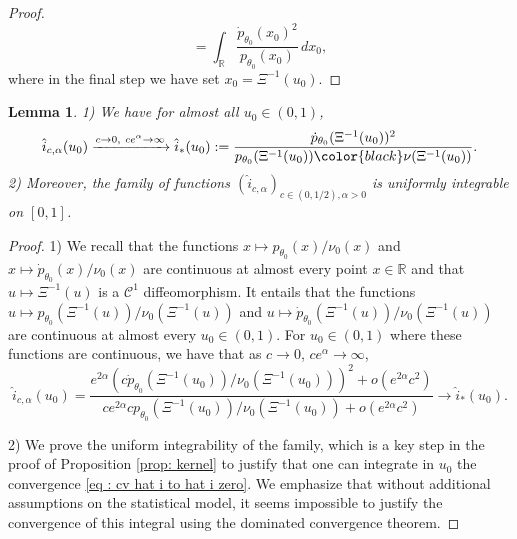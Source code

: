 \documentclass[a4paper, 11pt]{article}
\newtheorem{lemma}{Lemma}
\theoremstyle{definition}
\newcommand{\modar}{\color{black}}
\begin{document}
{\begin{proof}
\begin{equation*}
 =
 \int_\mathbb{R}\frac{\dot{p}_{\theta_0}(x_0)^2}{p_{\theta_0}(x_0)}\, dx_0,
\end{equation*}
where in the final step %
we have set $x_0=\Xi^{-1}(u_0)$.
\end{proof}
\begin{lemma}\label{l: technical cv i}
1) We have for almost all $u_0\in (0,1)$,
\begin{equation}\label{eq : cv hat i to hat i zero}
\hat{i}_{c,\alpha}(u_0) \xrightarrow{c\to0,~ce^\alpha\to\infty}\hat{i}_*(u_0):=
 \frac{\dot{p}_{\theta_0}(\Xi^{-1}(u_0))^2}{p_{\theta_0}(\Xi^{-1}(u_0)){\modar \nu}(\Xi^{-1}(u_0))}.
\end{equation}	
2) Moreover, the family of functions $(\hat{i}_{c,\alpha})_{c\in(0,1/2), \alpha>0}$ is uniformly integrable on $[0,1]$.
\end{lemma}
\begin{proof}
1) We recall that the functions $x\mapsto {p}_{\theta_0}(x)/\nu_0(x)$ and   
	$x\mapsto \dot{p}_{\theta_0}(x)/\nu_0(x)$  are continuous at almost every point $x\in\mathbb{R}$  and that $u\mapsto\Xi^{-1}(u)$ is a $\mathcal{C}^1$ diffeomorphism. It entails that the functions $u \mapsto  {p}_{\theta_0}(\Xi^{-1}(u))/\nu_0(\Xi^{-1}(u))$ and 
	$u \mapsto  \dot{p}_{\theta_0}(\Xi^{-1}(u))/\nu_0(\Xi^{-1}(u))$ are continuous at almost every $u_0\in(0,1)$. For $u_0\in(0,1)$ where these functions are continuous, we have that as $c\to 0$, $ce^\alpha \to \infty$,
\begin{equation*}
\hat{i}_{c,\alpha}(u_0) =
\frac{e^{2\alpha}  \left(c	\dot{p}_{\theta_0}(\Xi^{-1}(u_0))/\nu_0(\Xi^{-1}(u_0))\right)^2 + o(e^{2\alpha}c^2)}
	{ ce^{2\alpha} c {p}_{\theta_0}(\Xi^{-1}(u_0))/\nu_0(\Xi^{-1}(u_0)) + o(e^{2\alpha}c^2) } 	
	\to \hat{i}_*(u_0).
\end{equation*}
	
2) We prove the uniform integrability of the family, which is a key step in the proof of Proposition \ref{prop: kernel} to justify that one can integrate in $u_0$ the convergence	
\eqref{eq : cv hat i to hat i zero}. We emphasize that without additional assumptions on the statistical model, it seems impossible to justify the convergence of this integral using the dominated convergence theorem. 


\end{proof}}
\end{document}
